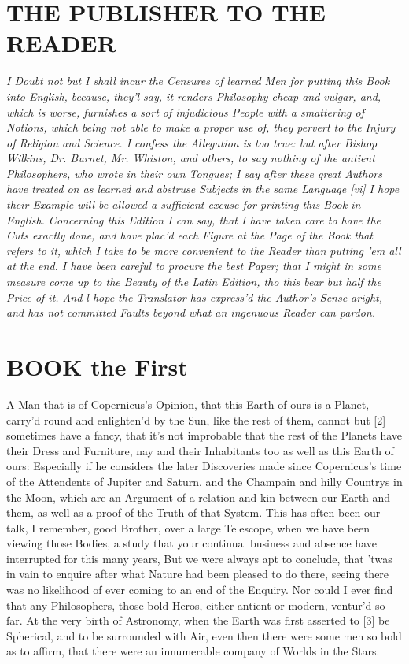 \documentclass[letterpaper]{book}
\begin{document}
\chapter{THE PUBLISHER TO THE READER} 

\emph{ I Doubt not but I shall incur the Censures of learned Men for putting
this Book into English, because, they'l say, it renders Philosophy cheap and
vulgar, and, which is worse, furnishes a sort of injudicious People with a
smattering of Notions, which being not able to make a proper use of, they
pervert to the Injury of Religion and Science. I confess the Allegation is
too true: but after Bishop Wilkins, Dr. Burnet, Mr. Whiston, and others, to
say nothing of the antient Philosophers, who wrote in their own Tongues; I
say after these great Authors have treated on as learned and abstruse
Subjects in the same Language [vi] I hope their Example will be allowed a
sufficient excuse for printing this Book in English.  Concerning this
Edition I can say, that I have taken care to have the Cuts exactly done, and
have plac'd each Figure at the Page of the Book that refers to it, which I
take to be more convenient to the Reader than putting 'em all at the end.  I
have been careful to procure the best Paper; that I might in some measure
come up to the Beauty of the Latin Edition, tho this bear but half the Price
of it.  And l hope the Translator has express'd the Author's Sense aright,
and has not committed Faults beyond what an ingenuous Reader can pardon.}

\tableofcontents
\mainmatter

\chapter{BOOK the First}
A Man that is of Copernicus's Opinion, that this Earth of ours is a Planet,
carry'd round and enlighten'd by the Sun, like the rest of them, cannot but
[2] sometimes have a fancy, that it's not improbable that the rest of the
Planets have their Dress and Furniture, nay and their Inhabitants too as
well as this Earth of ours: Especially if he considers the later Discoveries
made since Copernicus's time of the Attendents of Jupiter and Saturn, and
the Champain and hilly Countrys in the Moon, which are an Argument
of a relation and kin between our Earth and them, as well as a proof of
the Truth of that System. This has often been our talk, I remember, good
Brother, over a large Telescope, when we have been viewing those Bodies,
a study that your continual business and absence have interrupted for this
many years, But we were always apt to conclude, that 'twas in vain to
enquire after what Nature had been pleased to do there, seeing there was
no likelihood of ever coming to an end of the Enquiry. Nor could I ever find
that any Philosophers, those bold Heros, either antient or modern, ventur'd
so far. At the very birth of Astronomy, when the Earth was first asserted
to [3] be Spherical, and to be surrounded with Air, even then there were
some men so bold as to affirm, that there were an innumerable company of
Worlds in the Stars.
\end{document}
